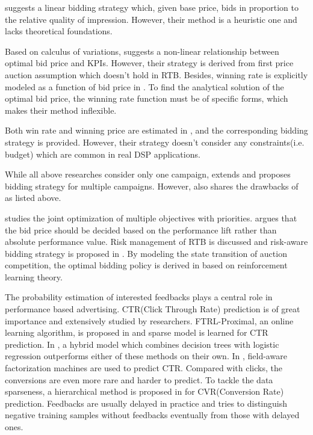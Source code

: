 \documentclass[sigconf]{acmart}
\begin{document}
\cite{M6D} suggests a linear bidding strategy which, given base price,
    bids in proportion to the relative quality of impression.
However, their method is a heuristic one and lacks theoretical foundations.

Based on calculus of variations, \cite{WeinanZhang2014} suggests a non-linear relationship between optimal bid price and KPIs.
However, their strategy is derived from first price auction assumption which doesn't hold in RTB.
Besides, winning rate is explicitly modeled as a function of bid price in \cite{WeinanZhang2014}.
To find the analytical solution of the optimal bid price,
    the winning rate function must be of specific forms,
    which makes their method inflexible.

Both win rate and winning price are estimated in \cite{XiangLi2014}, and the corresponding bidding strategy is provided.
However, their strategy doesn't consider any constraints(i.e. budget) which are common in real DSP applications.

While all above researches consider only one campaign,
    \cite{WeinanZhang2015} extends \cite{WeinanZhang2014} and proposes bidding strategy for multiple campaigns.
However, \cite{WeinanZhang2015} also shares the drawbacks of \cite{WeinanZhang2014} as listed above.

\cite{Joint2016} studies the joint optimization of multiple objectives with priorities.
\cite{Lift2016} argues that the bid price should be decided
    based on the performance lift rather than absolute performance value.
Risk management of RTB is discussed and risk-aware bidding strategy is proposed in \cite{Risk2017}.
By modeling the state transition of auction competition,
    the optimal bidding policy is derived in \cite{Reinforce2017} based on reinforcement learning theory.

The probability estimation of interested feedbacks plays a central role in performance based advertising.
CTR(Click Through Rate) prediction is of great importance and extensively studied by researchers.
FTRL-Proximal, an online learning algorithm, is proposed in \cite{Google2013} and sparse model is learned for CTR prediction.
In \cite{Facebook2014}, a hybrid model which combines decision trees with logistic regression
    outperforms either of these methods on their own.
In \cite{FFM2016}, field-aware factorization machines are used to predict CTR.
Compared with clicks, the conversions are even more rare and harder to predict.
To tackle the data sparseness, a hierarchical method is proposed in \cite{CVR} for CVR(Conversion Rate) prediction.
Feedbacks are usually delayed in practice and \cite{DelayedFeedback} tries to
    distinguish negative training samples without feedbacks eventually from those with delayed ones.
\end{document}
